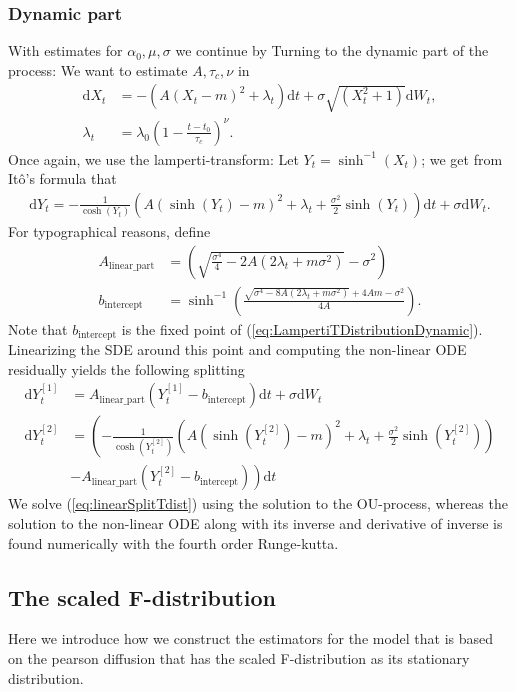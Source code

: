 \subsubsection{Dynamic part}
With estimates for $\alpha_0, \mu, \sigma$ we continue by Turning to the dynamic part of the process: We want to estimate $A, \tau_c, \nu$ in
\begin{align}
    \mathrm{d}X_t &= -\left(A(X_t - m)^2 + \lambda_t\right)\mathrm{d}t + \sigma \sqrt{\left(X_t^2 + 1\right)}\mathrm{d}W_t,\\
    \lambda_t &= \lambda_0 \left(1 - \frac{t - t_0}{\tau_c}\right)^\nu.
\end{align}
Once again, we use the lamperti-transform: Let $Y_t = \sinh^{-1}(X_t)$; we get from Itô's formula that
\begin{align}
    \mathrm{d}Y_t = -\frac{1}{\cosh(Y_t)}\left(A\left(\sinh(Y_t) - m\right)^2 + \lambda_t + \frac{\sigma^2}{2}\sinh(Y_t)\right)\mathrm{d}t + \sigma \mathrm{d}W_t. \label{eq:LampertiTDistributionDynamic}
\end{align}
For typographical reasons, define
\begin{align}
    A_{\textrm{linear\_part}} &= \left(\sqrt{\frac{\sigma^4}{4} - 2A\left(2\lambda_t + m\sigma^2\right)}-\sigma^2\right)\\
    b_{\textrm{intercept}} &= \sinh^{-1}\left(\frac{\sqrt{\sigma^4 - 8A\left(2\lambda_t + m \sigma^2\right)} + 4 Am - \sigma^2}{4A}\right).
\end{align}
Note that $b_{\textrm{intercept}}$ is the fixed point of (\ref{eq:LampertiTDistributionDynamic}). Linearizing the SDE around this point and computing the non-linear ODE residually yields the following splitting
\begin{align}
    \mathrm{d}Y_t^{[1]} &= A_{\textrm{linear\_part}}\left(Y_t^{[1]} - b_{\textrm{intercept}}\right)\mathrm{d}t + \sigma \mathrm{d}W_t \label{eq:linearSplitTdist} \\
    \mathrm{d}Y_t^{[2]} &= \left(-\frac{1}{\cosh(Y_t^{[2]})}\left(A\left(\sinh(Y_t^{[2]}) - m\right)^2 + \lambda_t + \frac{\sigma^2}{2}\sinh(Y_t^{[2]})\right)\right.\\
     &\left.- A_{\textrm{linear\_part}}\left(Y_t^{[2]} - b_{\textrm{intercept}}\right)\right)\mathrm{d}t
\end{align}
We solve (\ref{eq:linearSplitTdist}) using the solution to the OU-process, whereas the solution to the non-linear ODE along with its inverse and derivative of inverse is found numerically with the fourth order Runge-kutta.
\subsection{The scaled F-distribution}
Here we introduce how we construct the estimators for the model that is based on the pearson diffusion that has the scaled F-distribution as its stationary distribution. 
